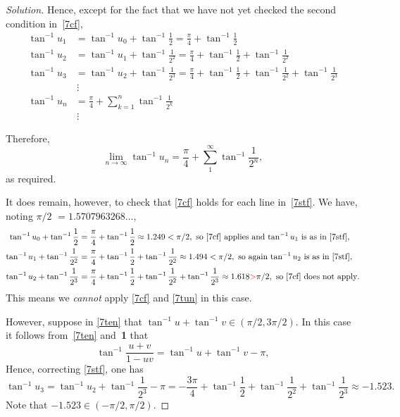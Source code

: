 \documentclass[11pt,a4paper]{report}
\theoremstyle{plain}
\theoremstyle{definition}
\begin{document}
\begin{proof}[Solution]
Hence, except for the fact that we have not yet checked the second condition in~\eqref{7cf},
\begin{equation} \label{7stf} 
\begin{aligned}
\tan^{-1}u_1 &= \tan^{-1} u_0 + \tan^{-1} \frac{1}{2} = \frac{\pi}{4} + \tan^{-1} \frac{1}{2}\\
\tan^{-1}u_2 &= \tan^{-1} u_1 + \tan^{-1} \frac{1}{2^2} = \frac{\pi}{4} + \tan^{-1} \frac{1}{2} + \tan^{-1} \frac{1}{2^2}\\
\tan^{-1}u_3 &= \tan^{-1} u_2 + \tan^{-1} \frac{1}{2^3} = \frac{\pi}{4} + \tan^{-1} \frac{1}{2} + \tan^{-1} \frac{1}{2^2} + \tan^{-1} \frac{1}{2^3}\\
	&\, \vdots \\
\tan^{-1}u_n &= \frac{\pi}{4} + \sum_{k=1}^n \tan^{-1} \frac{1}{2^k}\\
	&\, \vdots                 
\end{aligned} 
\end{equation} 
 
 Therefore,
\[
 \lim_{n\to\infty } \tan^{-1} u_n = \dfrac{\pi}{4} + \sum_1^\infty \tan^{-1} \dfrac{1}{2^n},
 \]
as required.

\medskip
It does remain, however, to check that \eqref{7cf} holds for each line in~\eqref{7stf}. 
We have, noting $ \pi/2$  $ = 1.5707963268\dots $,
\begin{align*}
\tan^{-1} u_0 + \tan^{-1} \frac{1}{2}     &= \frac{\pi}{4} + \tan^{-1} \frac{1}{2} \approx 1.249 < \pi/2, \text{ so~\eqref{7cf} applies and $ \tan^{-1} u_1$  is as in \eqref{7stf}},\\
\tan^{-1} u_1 + \tan^{-1} \frac{1}{2^2} &= \frac{\pi}{4} + \tan^{-1} \frac{1}{2} + \tan^{-1} \frac{1}{2^2} \approx 1.494 < \pi/2, 
									\text{ so again $ \tan^{-1} u_2$  is as in \eqref{7stf}},\\
\tan^{-1} u_2 + \tan^{-1} \frac{1}{2^3} &= \frac{\pi}{4} + \tan^{-1} \frac{1}{2} + \tan^{-1} \frac{1}{2^2} + \tan^{-1} \frac{1}{2^3}\approx 1.618 {\color{red}>}  \pi/2, \text{ so~\eqref{7cf} does not apply}.
\end{align*}
 This means we \emph{cannot} apply \eqref{7cf} and \eqref{7tun} in this case. 
 
 \medskip
 However, suppose in \eqref{7ten} that $ \tan^{-1} u + \tan^{-1} v \in (\pi/2, 3\pi/2 )$. In this case it follows from~\eqref{7ten} and~\textbf{1} that
  \begin{equation} \label{7if2} 
 \tan^{-1}  \frac{u+v} {1-uv } = \tan^{-1} u + \tan^{-1} v -\pi,
\end{equation} 
Hence, correcting \eqref{7stf}, one has
\begin{equation} \label{}
\tan^{-1}u_3  = \tan^{-1} u_2 + \tan^{-1} \frac{1}{2^3} -\pi = - \frac{3\pi}{4} + \tan^{-1} \frac{1}{2} + \tan^{-1} \frac{1}{2^2} + \tan^{-1} \frac{1}{2^3}\approx -1.523.
 \end{equation} 
Note that $ -1.523 \in (-\pi/2,\pi/2 ) $.


\end{proof}
\end{document}
